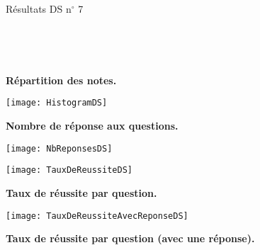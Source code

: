 \documentclass[10pt,a4paper,landscape]{article}
\begin{document}
\begin{center}
{\Huge
Résultats DS n$^\circ$ 7  \par}

~~

~~

\begin{minipage}{0.45\linewidth}
\begin{center}
\textbf{Répartition des notes.}
\end{center}



\texttt{[image: HistogramDS]}
\end{minipage}
\begin{minipage}{0.45\linewidth}
\begin{center}
\textbf{Nombre de réponse aux questions.}
\end{center}

\texttt{[image: NbReponsesDS]}
\end{minipage}

\vfill
\begin{minipage}{0.45\linewidth}
\texttt{[image: TauxDeReussiteDS]}

\begin{center}
\textbf{Taux de réussite par question.}
\end{center}
\end{minipage}
\hfill
\begin{minipage}{0.45\linewidth}


\texttt{[image: TauxDeReussiteAvecReponseDS]}

\begin{center}
\textbf{Taux de réussite par question (avec une réponse).}
\end{center}
\end{minipage}



\end{center}
\end{document}
